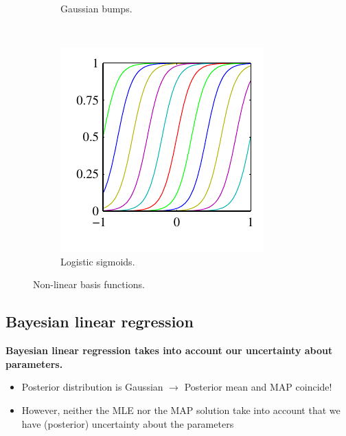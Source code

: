 \begin{figure}
\begin{subfigure}[b]{0.3\textwidth}
                \caption{Gaussian bumps.}
    \end{subfigure}%
	~
	\begin{subfigure}[b]{0.3\textwidth}
                \centering
                \includegraphics[width=\textwidth]{./lecture5/Figure31c.pdf}
                \caption{Logistic sigmoids.}
    \end{subfigure}%
    \caption{Non-linear basis functions.}
\end{figure}


\subsection{Bayesian linear regression}


\textbf{Bayesian linear regression takes into account our uncertainty about parameters.}

\begin{itemize}
\item Posterior distribution is Gaussian $\rightarrow$ Posterior mean and MAP coincide!
\item  However, neither the MLE nor the MAP solution take into account that we have (posterior) uncertainty about the parameters
\end{itemize}


